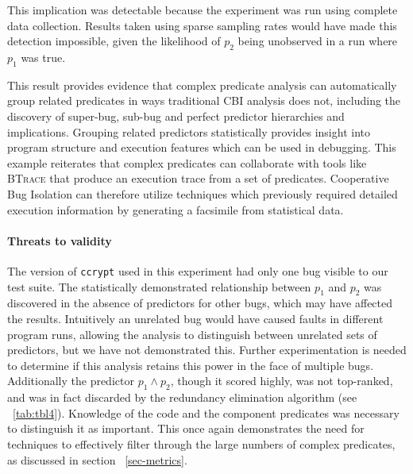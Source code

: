 This implication was detectable because the experiment was run using complete data collection.  Results taken using sparse sampling rates would have made this detection impossible, given the likelihood of $p_2$ being unobserved in a run where $p_1$ was true.

This result provides evidence that complex predicate analysis can automatically group related predicates in ways traditional CBI analysis does not, including the discovery of super-bug, sub-bug and perfect predictor hierarchies and implications.  Grouping related predictors statistically provides insight into program structure and execution features which can be used in debugging.  This example reiterates that complex predicates can collaborate with tools like \textsc{BTrace} that produce an execution trace from a set of predicates.  Cooperative Bug Isolation can therefore utilize techniques which previously required detailed execution information by generating a facsimile from statistical data.

\paragraph{Threats to validity}

The version of \texttt{ccrypt} used in this experiment had only one bug visible to our test suite.  The statistically demonstrated relationship between $p_1$ and $p_2$ was discovered in the absence of predictors for other bugs, which may have affected the results.  Intuitively an unrelated bug would have caused faults in different program runs, allowing the analysis to distinguish between unrelated sets of predictors, but we have not demonstrated this.  Further experimentation is needed to determine if this analysis retains this power in the face of multiple bugs.  Additionally the predictor $p_1 \wedge p_2$, though it scored highly, was not top-ranked, and was in fact discarded by the redundancy elimination algorithm (see ~\autoref{tab:tbl4}).  Knowledge of the code and the component predicates was necessary to distinguish it as important.  This once again demonstrates the need for techniques to effectively filter through the large numbers of complex predicates, as discussed in section ~\ref{sec-metrics}.
